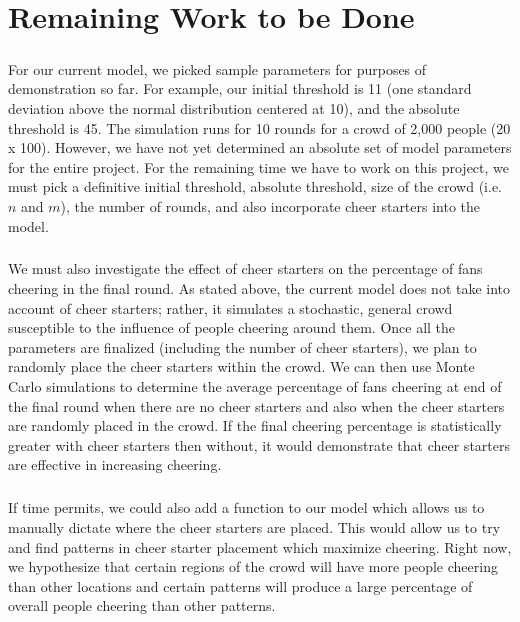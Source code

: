 \documentclass[oneside,12pt]{report}
\def\prefacesection#1{
\chapter*{#1}
\addcontentsline{toc}{chapter}{#1}
}
\begin{document}
\prefacesection{Remaining Work to be Done}
\paragraph{}
For our current model, we picked sample parameters for purposes of demonstration so far. For example, our initial threshold is 11 (one standard deviation above the normal distribution centered at 10), and the absolute threshold is 45. The simulation runs for 10 rounds for a crowd of 2,000 people (20 x 100). However, we have not yet determined an absolute set of model parameters for the entire project. For the remaining time we have to work on this project, we must pick a definitive initial threshold, absolute threshold, size of the crowd (i.e. $n$ and $m$), the number of rounds, and also incorporate cheer starters into the model.
\paragraph{}
We must also investigate the effect of cheer starters on the percentage of fans cheering in the final round. As stated above, the current model does not take into account of cheer starters; rather, it simulates a stochastic, general crowd susceptible to the influence of people cheering around them. Once all the parameters are finalized (including the number of cheer starters), we plan to randomly place the cheer starters within the crowd. We can then use Monte Carlo simulations to determine the average percentage of fans cheering at end of the final round when there are no cheer starters and also when the cheer starters are randomly placed in the crowd. If the final cheering percentage is statistically greater with cheer starters then without, it would demonstrate that cheer starters are effective in increasing cheering. 
 
\paragraph{}
If time permits, we could also add a function to our model which allows us to manually dictate where the cheer starters are placed. This would allow us to try and find patterns in cheer starter placement which maximize cheering. Right now, we hypothesize that certain regions of the crowd will have more people cheering than other locations and certain patterns will produce a large percentage of overall people cheering than other patterns.
\end{document}
